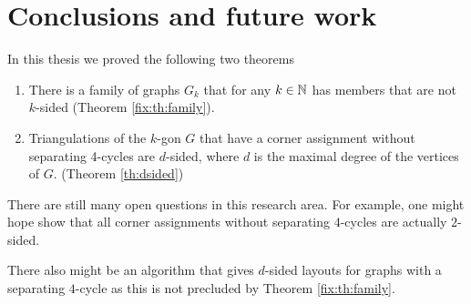 
\section{ Conclusions and future work }

In this thesis we proved the following two theorems

\begin{enumerate}
  \item There is a family of graphs $G_k$ that for any $k \in \mathbb{N}$ has members that are not $k$-sided (Theorem \ref{fix:th:family}).
  \item Triangulations of the $k$-gon $G$ that have a corner assignment without separating 4-cycles are $d$-sided, where $d$ is the maximal degree of the vertices of $G$. (Theorem \ref{th:dsided})
\end{enumerate}

There are still many open questions in this research area. For example, one might hope show that all corner assignments without separating $4$-cycles are actually $2$-sided.

There also might be an algorithm that gives $d$-sided layouts for graphs with a separating $4$-cycle as this is not precluded by Theorem \ref{fix:th:family}.
